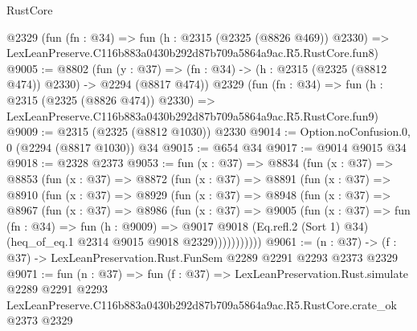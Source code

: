 \begin{lexlean}{RustCore}
\begin{coremodule}
    @2329
    (fun (fn : @34) =>
    fun (h : @2315 (@2325 (@8826 @469)) @2330) =>
    LexLeanPreserve.C116b883a0430b292d87b709a5864a9ac.R5.RustCore.fun8)
@9005 := @8802
    (fun (y : @37) => (fn : @34) -> (h : @2315 (@2325 (@8812 @474)) @2330) -> @2294 (@8817 @474))
    @2329
    (fun (fn : @34) =>
    fun (h : @2315 (@2325 (@8826 @474)) @2330) =>
    LexLeanPreserve.C116b883a0430b292d87b709a5864a9ac.R5.RustCore.fun9)
@9009 := @2315 (@2325 (@8812 @1030)) @2330
@9014 := Option.noConfusion.{0, 0} (@2294 (@8817 @1030)) @34
@9015 := @654 @34
@9017 := @9014 @9015 @34
@9018 := @2328 @2373
@9053 := fun (x : @37) =>
  @8834
    (fun (x : @37) =>
    @8853
      (fun (x : @37) =>
      @8872
        (fun (x : @37) =>
        @8891
          (fun (x : @37) =>
          @8910
            (fun (x : @37) =>
            @8929
              (fun (x : @37) =>
              @8948
                (fun (x : @37) =>
                @8967
                  (fun (x : @37) =>
                  @8986
                    (fun (x : @37) =>
                    @9005
                      (fun (x : @37) =>
                      fun (fn : @34) =>
                      fun (h : @9009) =>
                      @9017
                        @9018
                        (Eq.refl.{2} (Sort 1) @34)
                        (heq_of_eq.{1} @2314 @9015 @9018 @2329)))))))))))
@9061 := (n : @37) -> (f : @37) -> LexLeanPreservation.Rust.FunSem @2289 @2291 @2293 @2373 @2329
@9071 := fun (n : @37) =>
  fun (f : @37) =>
  LexLeanPreservation.Rust.simulate
    @2289
    @2291
    @2293
    LexLeanPreserve.C116b883a0430b292d87b709a5864a9ac.R5.RustCore.crate_ok
    @2373
    @2329
\end{coremodule}
\end{lexlean}
